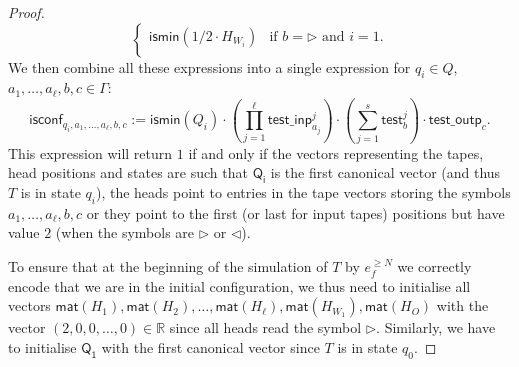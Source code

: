 \begin{proof}
$$\begin{cases}
\mathsf{ismin}(1/2\cdot H_{W_i}) & \text{if $b=\rhd$ and $i=1$}.\\
\end{cases}
$$
We then combine all these expressions into a single expression for $q_i\in Q$, $a_1,\ldots,a_\ell,b,c\in\Gamma$:
$$
\mathsf{isconf}_{q_i,a_1,\ldots,a_\ell,b,c}:=
\mathsf{ismin}(Q_i)\cdot \left(\prod_{j=1}^{\ell} \mathsf{test\_inp}_{a_j}^j\right)
\cdot\left(\sum_{j=1}^s \mathsf{test}_b^j\right)\cdot \mathsf{test\_outp}_{c}.
$$
This expression will return $1$ if and only if the vectors representing the tapes, head positions and states are such that $\mathsf{Q_i}$ is the first canonical vector (and thus $T$ is in state $q_i$), the heads point to entries in the tape vectors storing the symbols $a_1,\ldots,a_{\ell}, b,c$ or they point to the first (or last for input tapes) positions but have value $2$ (when the symbols are $\rhd$ or $\lhd$). 

To ensure that at the beginning of the simulation of $T$ by $e_f^{\geq N}$ we correctly encode that we are in the initial configuration, we thus need to initialise all vectors $\mathsf{mat}(H_1),\mathsf{mat}(H_2),\ldots, \mathsf{mat}(H_\ell), \mathsf{mat}(H_{W_1}),\mathsf{mat}(H_O)$ with the vector $(2,0,0,\ldots,0)\in\mathbb{R}$ since all heads read the symbol $\rhd$. Similarly, we have to initialise $\mathsf{Q_1}$ with the first canonical vector since $T$ is in state $q_0$.


\end{proof}
